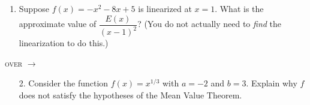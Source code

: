 \documentclass[11pt]{article}
\begin{document}
\pagestyle{empty}
\newsavebox{\quizfront}
\begin{lrbox}{\quizfront}
\begin{minipage}[top][4.5in][t]{\textwidth} \setlength{\parindent}{1.5em}
\drawtitle
\vspace{-0.5in}
\begin{enumerate}

\item Suppose $f(x) = -x^2 - 8x + 5$ is linearized at $x=1$. What is
  the approximate value of $\dfrac{E(x)}{(x-1)^2}$? (You do not
  actually need to \emph{find} the linearization to do this.)

\end{enumerate}

\vfill

\hfill\textsc{over} $\longrightarrow$


\end{minipage}
\end{lrbox}

\newsavebox{\quizback}
\begin{lrbox}{\quizback}
\begin{minipage}[top][4.5in][t]{\textwidth} \setlength{\parindent}{1.5em}
\begin{enumerate}
\item[2.] Consider the function $f(x) = x^{1/3}$ with $a=-2$ and
  $b=3$. Explain why $f$ does not satisfy the hypotheses of the Mean
  Value Theorem.

\end{enumerate}
\end{minipage}
\end{lrbox}

\noindent \usebox{\quizfront}
\vfill
\noindent \usebox{\quizfront}

\pagebreak
\noindent \usebox{\quizback}
\vfill
\noindent \usebox{\quizback}
\end{document}
